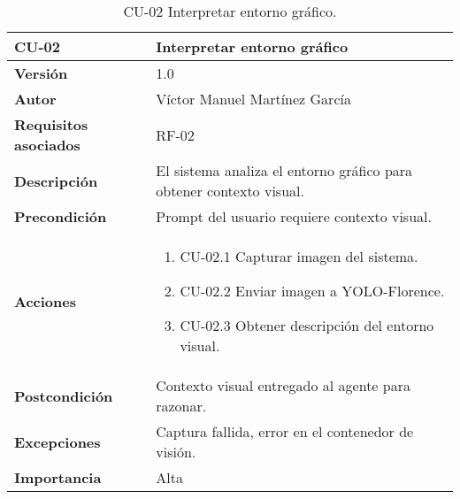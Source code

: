 \begin{table}[p]
    \centering
    \begin{tabularx}{\linewidth}{ p{} p{} }
        \toprule
        \textbf{CU-02}    & \textbf{Interpretar entorno gráfico}\\
        \toprule
        \textbf{Versión}              & 1.0 \\
        \textbf{Autor}                & Víctor Manuel Martínez García \\
        \textbf{Requisitos asociados} & RF-02 \\
        \textbf{Descripción}          & El sistema analiza el entorno gráfico para obtener contexto visual.\\
        \textbf{Precondición}         & Prompt del usuario requiere contexto visual.\\
        \textbf{Acciones}             &
        \begin{enumerate}
          \item CU-02.1 Capturar imagen del sistema.
          \item CU-02.2 Enviar imagen a YOLO-Florence.
          \item CU-02.3 Obtener descripción del entorno visual.
        \end{enumerate}\\
        \textbf{Postcondición}        & Contexto visual entregado al agente para razonar.\\
        \textbf{Excepciones}          & Captura fallida, error en el contenedor de visión.\\
        \textbf{Importancia}          & Alta \\
        \bottomrule
    \end{tabularx}
    \caption{CU-02 Interpretar entorno gráfico.}
    \label{CU-02 Interpretar entorno grafico}
\end{table}



